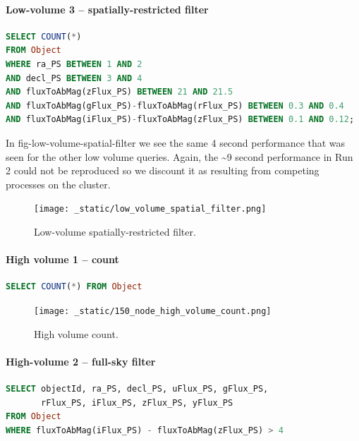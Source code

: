 \documentclass[DM,lsstdraft,toc]{lsstdoc}
\begin{document}
\paragraph{Low-volume 3 -- spatially-restricted
filter}\label{low-volume-3-spatially-restricted-filter}

\begin{lstlisting}[language=SQL]
SELECT COUNT(*)
FROM Object
WHERE ra_PS BETWEEN 1 AND 2
AND decl_PS BETWEEN 3 AND 4
AND fluxToAbMag(zFlux_PS) BETWEEN 21 AND 21.5
AND fluxToAbMag(gFlux_PS)-fluxToAbMag(rFlux_PS) BETWEEN 0.3 AND 0.4
AND fluxToAbMag(iFlux_PS)-fluxToAbMag(zFlux_PS) BETWEEN 0.1 AND 0.12;
\end{lstlisting}

In fig-low-volume-spatial-filter we see the same 4 second performance
that was seen for the other low volume queries. Again, the
\textasciitilde{}9 second performance in Run 2 could not be reproduced
so we discount it as resulting from competing processes on the cluster.

\begin{figure}[H]
\centering
\texttt{[image: \_static/low\_volume\_spatial\_filter.png]}
\caption{Low-volume spatially-restricted filter.}
\end{figure}

\paragraph{High volume 1 -- count}\label{high-volume-1-count}

\begin{lstlisting}[language=SQL]
SELECT COUNT(*) FROM Object
\end{lstlisting}

\begin{figure}[H]
\centering
\texttt{[image: \_static/150\_node\_high\_volume\_count.png]}
\caption{High volume count.}
\end{figure}

\paragraph{High-volume 2 -- full-sky
filter}\label{high-volume-2-full-sky-filter}

\begin{lstlisting}[language=SQL]
SELECT objectId, ra_PS, decl_PS, uFlux_PS, gFlux_PS,
       rFlux_PS, iFlux_PS, zFlux_PS, yFlux_PS
FROM Object
WHERE fluxToAbMag(iFlux_PS) - fluxToAbMag(zFlux_PS) > 4
\end{lstlisting}
\end{document}
